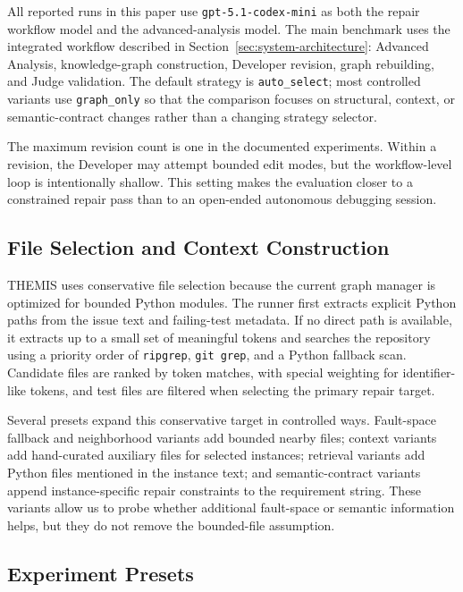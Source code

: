 \documentclass[11pt]{article}
\begin{document}
All reported runs in this paper use \texttt{gpt-5.1-codex-mini} as both the repair workflow model and the advanced-analysis model.  The main benchmark uses the integrated workflow described in Section~\ref{sec:system-architecture}: Advanced Analysis, knowledge-graph construction, Developer revision, graph rebuilding, and Judge validation.  The default strategy is \texttt{auto\_select}; most controlled variants use \texttt{graph\_only} so that the comparison focuses on structural, context, or semantic-contract changes rather than a changing strategy selector.

The maximum revision count is one in the documented experiments.  Within a revision, the Developer may attempt bounded edit modes, but the workflow-level loop is intentionally shallow.  This setting makes the evaluation closer to a constrained repair pass than to an open-ended autonomous debugging session.

\subsection{File Selection and Context Construction}
\label{subsec:file-selection}

THEMIS uses conservative file selection because the current graph manager is optimized for bounded Python modules.  The runner first extracts explicit Python paths from the issue text and failing-test metadata.  If no direct path is available, it extracts up to a small set of meaningful tokens and searches the repository using a priority order of \texttt{ripgrep}, \texttt{git grep}, and a Python fallback scan.  Candidate files are ranked by token matches, with special weighting for identifier-like tokens, and test files are filtered when selecting the primary repair target.

Several presets expand this conservative target in controlled ways.  Fault-space fallback and neighborhood variants add bounded nearby files; context variants add hand-curated auxiliary files for selected instances; retrieval variants add Python files mentioned in the instance text; and semantic-contract variants append instance-specific repair constraints to the requirement string.  These variants allow us to probe whether additional fault-space or semantic information helps, but they do not remove the bounded-file assumption.

\subsection{Experiment Presets}
\label{subsec:presets}
\end{document}
